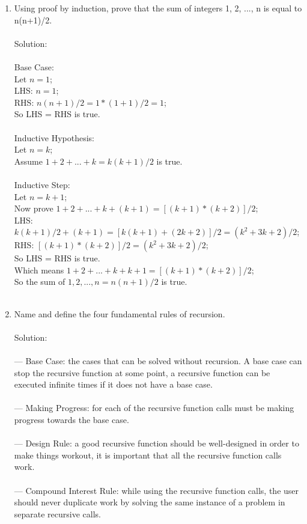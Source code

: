 \documentclass[12pt]{article}
\begin{document}
\begin{enumerate}
\item  Using proof by induction, prove that the sum of integers 1, 2, ..., n is
  equal to n(n+1)/2.
  \\\\Solution:\\
  \\Base Case: 
  \\Let $n = 1$;
  \\LHS: $n = 1$;
  \\RHS: $n(n+1)/2 = 1*(1+1)/2 = 1$;
  \\So LHS = RHS is true.
  \\\\Inductive Hypothesis:
  \\Let $n = k$;
  \\Assume $1 + 2+ ...+ k = k(k+1)/2$ is true.
  \\\\Inductive Step:
  \\Let $n = k+1$;
  \\Now prove $1+ 2+ ...+ k+ (k+1) = [ (k+1)*(k+2) ] / 2$;
  \\LHS: $k(k+1)/2 + (k+1) = [ k(k+1)+(2k+2) ] / 2 = (k^2+3k+2) / 2$;
  \\RHS: $[ (k+1)*(k+2) ] / 2 = (k^2+3k+2) / 2$;
  \\So LHS = RHS is true.
  \\Which means $1+ 2+...+ k+k+1 = [ (k+1)*(k+2) ] / 2$;
  \\So the sum of $1, 2, ..., n =  n(n+1)/2$ is true.
  \\\\

\item  Name and define the four fundamental rules of recursion.
\\\\Solution:\\
\\--- Base Case: the cases that can be solved without recursion. A base case can stop the recursive function at some point, a recursive function can be executed infinite times if it does not have a base case.
\\\\--- Making Progress: for each of the recursive function calls must be making progress towards the base case.
\\\\--- Design Rule: a good recursive function should be well-designed in order to make things workout, it is important that all the recursive function calls work.
\\\\--- Compound Interest Rule: while using the recursive function calls, the user should never duplicate work by solving the same instance of a problem in separate recursive calls.
\\
 

\end{enumerate}
\end{document}
